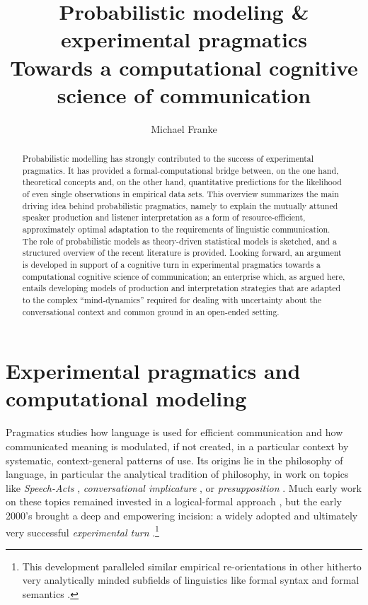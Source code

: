 \documentclass[fleqn,reqno,12pt]{article}
\title{
  Probabilistic modeling \& experimental pragmatics \\
  \large{Towards a computational cognitive science of communication}
}
\author{Michael Franke}
\date{}
\begin{document}
\maketitle

\begin{abstract}
  \noindent
  Probabilistic modelling has strongly contributed to the success of experimental pragmatics.
  It has provided a formal-computational bridge between, on the one hand, theoretical concepts and, on the other hand, quantitative predictions for the likelihood of even single observations in empirical data sets.
  This overview summarizes the main driving idea behind probabilistic pragmatics, namely to explain the mutually attuned speaker production and listener interpretation as a form of resource-efficient, approximately optimal adaptation to the requirements of linguistic communication.
  The role of probabilistic models as theory-driven statistical models is sketched, and a structured overview of the recent literature is provided.
  Looking forward, an argument is developed in support of a cognitive turn in experimental pragmatics towards a computational cognitive science of communication; an enterprise which, as argued here, entails developing models of production and interpretation strategies that are adapted to the complex ``mind-dynamics'' required for dealing with uncertainty about the conversational context and common ground in an open-ended setting.
\end{abstract}


\section{Experimental pragmatics and computational modeling}
\label{sec:exper-pragm-comp}

Pragmatics studies how language is used for efficient communication and how communicated meaning is modulated, if not created, in a particular context by systematic, context-general patterns of use.
Its origins lie in the philosophy of language, in particular the analytical tradition of philosophy, in work on topics like \emph{Speech-Acts} \citep{Austin1962:How-to-do-Thing,Searle1969:Speech-Acts:-An}, \emph{conversational implicature} \citep{Grice1975:Logic-and-Conve}, or \emph{presupposition} \citep{Stalnaker1973:Presupposition,Karttunen1973:Presuppositions}.
Much early work on these topics remained invested in a logical-formal approach \citep{Gazdar1979:Pragmatics:-Imp,Kadmon2001:Formal-Pragmati}, but the early 2000's brought a deep and empowering incision: a widely adopted and ultimately very successful \emph{experimental turn} \citep{NoveckSperber2004:Experimental-Pr,Noveck2018:Experimental-Pr}.\footnote{
  This development paralleled similar empirical re-orientations in other hitherto very analytically minded subfields of linguistics like formal syntax \citep{Sprouse2007:A-program-for-e,Sprouse2023:The-Oxf-Handb-Exp-Syntax} and formal semantics \citep{MeibauerSteinbach2011:Experimental-Pr,CumminsKatsos2019:The-Oxford-Hand}.
}
\end{document}
